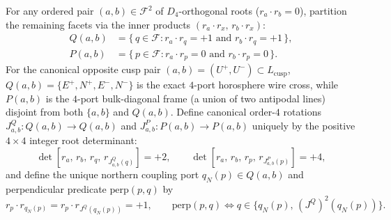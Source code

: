 For any ordered pair $(a, b) \in \mathcal{F}^2$ of $D_4$-orthogonal roots ($r_a \cdot r_b = 0$), partition the remaining facets via the inner products $(r_a \cdot r_x,\, r_b \cdot r_x)$:
\begin{align}
Q(a,b) &= \{\, q \in \mathcal{F} : r_a \cdot r_q = +1 \text{ and } r_b \cdot r_q = +1 \,\}, \label{eq:q-set}\\
P(a,b) &= \{\, p \in \mathcal{F} : r_a \cdot r_p = 0 \text{ and } r_b \cdot r_p = 0 \,\}. \label{eq:p-set}
\end{align}
For the canonical opposite cusp pair $(a,b) = (U^+, U^-) \subset L_{\mathrm{cusp}}$, $Q(a,b) = \{E^+, N^+, E^-, N^-\}$ is the exact $4$-port horosphere wire cross, while $P(a,b)$ is the $4$-port bulk-diagonal frame (a union of two antipodal lines) disjoint from both $\{a,b\}$ and $Q(a,b)$. Define canonical order-$4$ rotations $J^Q_{a,b} : Q(a,b) \to Q(a,b)$ and $J^P_{a,b} : P(a,b) \to P(a,b)$ uniquely by the positive $4 \times 4$ integer root determinant:
\begin{equation}
\label{eq:det-rot}
\det[r_a,\, r_b,\, r_q,\, r_{J^Q_{a,b}(q)}] = +2, \qquad
\det[r_a,\, r_b,\, r_p,\, r_{J^P_{a,b}(p)}] = +4,
\end{equation}
and define the unique northern coupling port $q_N(p) \in Q(a,b)$ and perpendicular predicate $\mathrm{perp}(p, q)$ by
\begin{equation}
\label{eq:qn-perp}
r_p \cdot r_{q_N(p)} = r_p \cdot r_{J^Q(q_N(p))} = +1, \qquad
\mathrm{perp}(p, q) \iff q \in \bigl\{q_N(p),\, (J^Q)^2(q_N(p))\bigr\}.
\end{equation}


